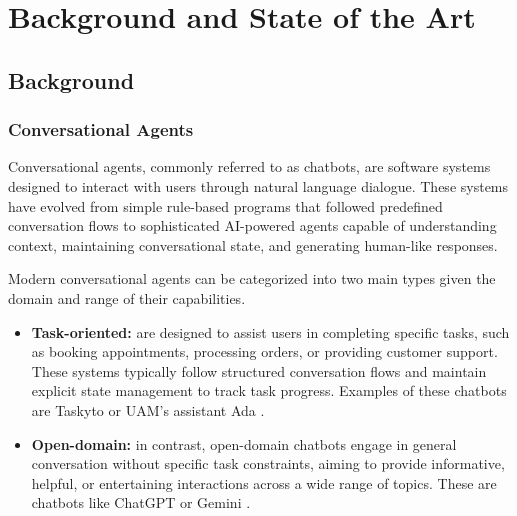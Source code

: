 
\chapter{Background and State of the Art}\label{chapter:state_of_the_art}


\section{Background}

\subsection{Conversational Agents}

Conversational agents, commonly referred to as chatbots,
are software systems designed to interact with users through natural language dialogue.
These systems have evolved from simple rule-based programs that followed predefined conversation flows
to sophisticated AI-powered agents capable of understanding context, maintaining conversational state, and generating human-like responses.

Modern conversational agents can be categorized into two main types
given the domain and range of their capabilities.
\begin{itemize}
  \item \textbf{Task-oriented:}
    are designed to assist users in completing specific tasks,
    such as booking appointments, processing orders, or providing customer support.
  These systems typically follow structured conversation flows
and maintain explicit state management to track task progress.
  Examples of these chatbots are Taskyto \autocite{sanchezcuadradoAutomatingDevelopmentTaskoriented2024} or UAM's assistant Ada \autocite{AdaUAM}.

  \item \textbf{Open-domain:}
  in contrast, open-domain chatbots
  engage in general conversation without specific task constraints,
  aiming to provide informative, helpful, or entertaining interactions across a wide range of topics.
  These are chatbots like ChatGPT \autocite{ChatGPT} or Gemini \autocite{GoogleGemini}.
\end{itemize}

